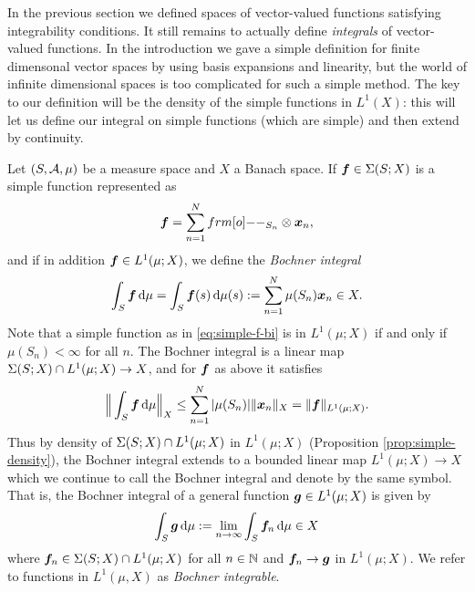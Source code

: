 In the previous section we defined spaces of vector-valued functions satisfying integrability conditions.
It still remains to actually define \emph{integrals} of vector-valued functions.
In the introduction we gave a simple definition for finite dimensonal vector spaces by using basis expansions and linearity, but the world of infinite dimensional spaces is too complicated for such a simple method.
The key to our definition will be the density of the simple functions in $L^1(X)$: this will let us define our integral on simple functions (which are simple) and then extend by continuity.

Let $(S,\mathcal{A},\mu)$ be a measure space and $X$ a Banach space.
If $\bm{f} \in \Sigma(S;X)$ is a simple function represented as
\begin{equation}\label{eq:simple-f-bi}
  \mb{f} = \sum_{n=1}^N \1_{S_n} \otimes \mb{x}_n ,
\end{equation}
and if in addition $\bm{f} \in L^1(\mu;X)$, we define the \emph{Bochner integral}
\begin{equation*}
  \int_S \bm{f} \, \mathrm{d}\mu = \int_S \bm{f}(s) \, \mathrm{d} \mu(s) := \sum_{n=1}^N \mu(S_n) \bm{x}_n \in X.
\end{equation*}
Note that a simple function as in \eqref{eq:simple-f-bi} is in $L^1(\mu;X)$ if and only if $\mu(S_n) < \infty$ for all $n$.
The Bochner integral is a linear map $\Sigma(S;X) \cap L^1(\mu;X) \to X$, and for $\bm{f}$ as above it satisfies
\begin{equation*}
  \Big\| \int_S \bm{f} \, \mathrm{d} \mu \Big\|_X \leq \sum_{n=1}^{N} |\mu(S_n)| \|\bm{x}_n\|_X = \|\bm{f}\|_{L^1(\mu;X)}.
\end{equation*}
Thus by density of $\Sigma(S;X) \cap L^1(\mu;X)$ in $L^1(\mu;X)$ (Proposition \ref{prop:simple-density}), the Bochner integral extends to a bounded linear map $L^1(\mu;X) \to X$ which we continue to call the Bochner integral and denote by the same symbol.
That is, the Bochner integral of a general function $\bm{g} \in L^1(\mu;X)$ is given by 
\begin{equation*}
  \int_S \bm{g} \, \mathrm{d}\mu := \lim_{n \to \infty} \int_S \bm{f}_n \, \mathrm{d}\mu \in X
\end{equation*}
where $\bm{f}_n \in \Sigma(S;X) \cap L^1(\mu;X)$ for all $n \in \mathbb{N}$ and $\bm{f}_n \to \bm{g}$ in $L^1(\mu;X)$.
We refer to functions in $L^1(\mu,X)$ as \emph{Bochner integrable}.

